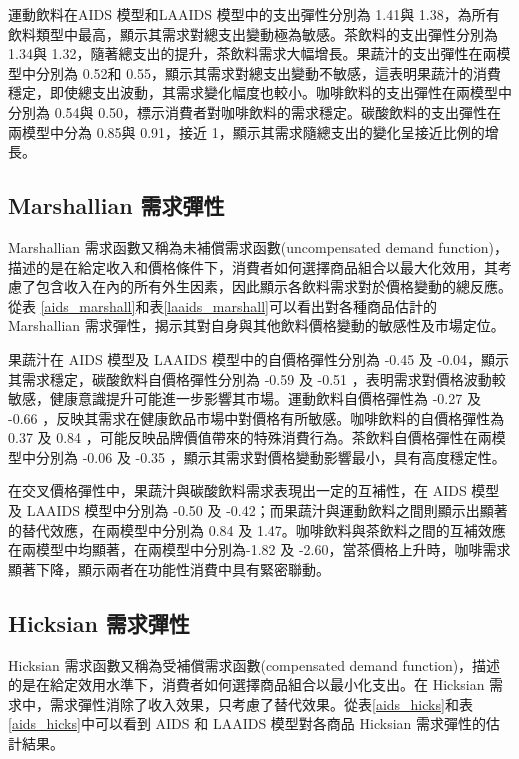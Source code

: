 運動飲料在AIDS 模型和LAAIDS 模型中的支出彈性分別為 1.41與 1.38，為所有飲料類型中最高，顯示其需求對總支出變動極為敏感。茶飲料的支出彈性分別為 1.34與 1.32，隨著總支出的提升，茶飲料需求大幅增長。果蔬汁的支出彈性在兩模型中分別為 0.52和 0.55，顯示其需求對總支出變動不敏感，這表明果蔬汁的消費穩定，即使總支出波動，其需求變化幅度也較小。咖啡飲料的支出彈性在兩模型中分別為 0.54與 0.50，標示消費者對咖啡飲料的需求穩定。碳酸飲料的支出彈性在兩模型中分為 0.85與 0.91，接近 1，顯示其需求隨總支出的變化呈接近比例的增長。


\subsection{Marshallian 需求彈性}

Marshallian 需求函數又稱為未補償需求函數(uncompensated demand function)，描述的是在給定收入和價格條件下，消費者如何選擇商品組合以最大化效用，其考慮了包含收入在內的所有外生因素，因此顯示各飲料需求對於價格變動的總反應。從表 \ref{aids_marshall}和表\ref{laaids_marshall}可以看出對各種商品估計的 Marshallian 需求彈性，揭示其對自身與其他飲料價格變動的敏感性及市場定位。

果蔬汁在 AIDS 模型及 LAAIDS 模型中的自價格彈性分別為 -0.45 及 -0.04，顯示其需求穩定，碳酸飲料自價格彈性分別為 -0.59 及 -0.51 ，表明需求對價格波動較敏感，健康意識提升可能進一步影響其市場。運動飲料自價格彈性為 -0.27 及 -0.66 ，反映其需求在健康飲品市場中對價格有所敏感。咖啡飲料的自價格彈性為 0.37 及 0.84 ，可能反映品牌價值帶來的特殊消費行為。茶飲料自價格彈性在兩模型中分別為 -0.06  及 -0.35 ，顯示其需求對價格變動影響最小，具有高度穩定性。

在交叉價格彈性中，果蔬汁與碳酸飲料需求表現出一定的互補性，在 AIDS 模型及 LAAIDS 模型中分別為 -0.50 及 -0.42；而果蔬汁與運動飲料之間則顯示出顯著的替代效應，在兩模型中分別為 0.84 及 1.47。咖啡飲料與茶飲料之間的互補效應在兩模型中均顯著，在兩模型中分別為-1.82 及 -2.60，當茶價格上升時，咖啡需求顯著下降，顯示兩者在功能性消費中具有緊密聯動。


\subsection{Hicksian 需求彈性}

Hicksian 需求函數又稱為受補償需求函數(compensated demand function)，描述的是在給定效用水準下，消費者如何選擇商品組合以最小化支出。在 Hicksian 需求中，需求彈性消除了收入效果，只考慮了替代效果。從表\ref{aids_hicks}和表\ref{aids_hicks}中可以看到 AIDS 和 LAAIDS 模型對各商品 Hicksian 需求彈性的估計結果。

